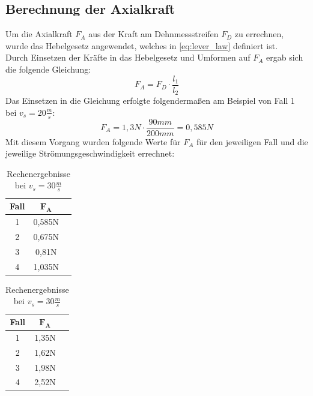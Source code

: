 \subsection{Berechnung der Axialkraft}
\label{subsec:f_a_calculation_wind_tunnel}
Um die Axialkraft $F_A$ aus der Kraft am Dehnmessstreifen $F_D$ zu errechnen, wurde das Hebelgesetz angewendet, welches in \ref{eq:lever_law} definiert ist.
\\
Durch Einsetzen der Kräfte in das Hebelgesetz und Umformen auf $F_A$ ergab sich die folgende Gleichung:
\begin{equation}
    F_A = F_D \cdot \frac{l_1}{l_2}
\end{equation}
Das Einsetzen in die Gleichung erfolgte folgendermaßen am Beispiel von Fall 1 bei $v_s = 20\frac{m}{s}$:
\begin{equation}
    F_A = 1,3N \cdot \frac{90mm}{200mm} = 0,585N
\end{equation}
Mit diesem Vorgang wurden folgende Werte für $F_A$ für den jeweiligen Fall und die jeweilige Strömungsgeschwindigkeit errechnet:
\begin{table}[H]
\centering
\begin{minipage}{0.49\textwidth}
    \centering
    \begin{tabular}{|c|c|c|}
\hline
\textbf{Fall} & $\mathbf{F_A}$ \\
\hline
1 & 0,585N \\
2 & 0,675N \\
3 & 0,81N \\
4 & 1,035N \\
\hline
    \end{tabular}
    \caption {Rechenergebnisse bei $v_s = 20\frac{m}{s}$}
    \label{tab:wind_tunnel_calc_20ms}
    \end{minipage}
    \hfill
    \begin{minipage}{0.49\textwidth}
    \centering
    \begin{tabular}{|c|c|c|}
\hline
\textbf{Fall} & $\mathbf{F_A}$ \\
\hline
1 & 1,35N \\
2 & 1,62N \\
3 & 1,98N \\
4 & 2,52N \\
\hline
    \end{tabular}
    \caption{Rechenergebnisse bei $v_s = 30\frac{m}{s}$}
    \label{tab:wind_tunnel_caclc_30ms}
    \end{minipage}
\end{table}

